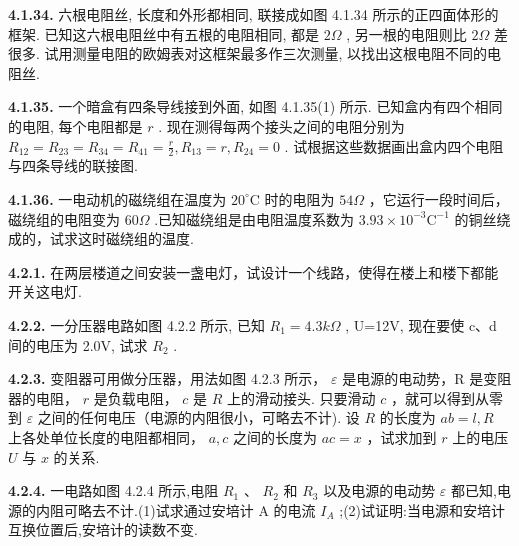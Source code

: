 \begin{center}
\end{center}

\vfill
\newpage

\textbf{4.1.34.} 六根电阻丝, 长度和外形都相同, 联接成如图 4.1.34 所示的正四面体形的框架. 已知这六根电阻丝中有五根的电阻相同, 都是 $2\Omega$ , 另一根的电阻则比 $2\Omega$ 差很多. 试用测量电阻的欧姆表对这框架最多作三次测量, 以找出这根电阻不同的电阻丝.

\vfill
\newpage

\textbf{4.1.35.} 一个暗盒有四条导线接到外面, 如图 4.1.35(1) 所示. 已知盒内有四个相同的电阻, 每个电阻都是 $r$ . 现在测得每两个接头之间的电阻分别为 $\displaystyle R_{12} = R_{23} = R_{34} = R_{41} = \frac{r}{2}, R_{13} = r, R_{24} = 0$ . 试根据这些数据画出盒内四个电阻与四条导线的联接图.

\begin{center}
\end{center}

\vfill
\newpage

\textbf{4.1.36.} 一电动机的磁绕组在温度为 $20^{\circ}\mathrm{C}$ 时的电阻为 $54\Omega$ ，它运行一段时间后，磁绕组的电阻变为 $60\Omega$ .已知磁绕组是由电阻温度系数为 $3.93\times 10^{-3}\mathrm{C}^{-1}$ 的铜丝绕成的，试求这时磁绕组的温度.

\vfill
\newpage

\textbf{4.2.1.} 在两层楼道之间安装一盏电灯，试设计一个线路，使得在楼上和楼下都能开关这电灯.

\vfill
\newpage

\textbf{4.2.2.} 一分压器电路如图 4.2.2 所示, 已知 $R_{1}=4.3k\Omega$ , U=12V, 现在要使 c、d 间的电压为 2.0V, 试求 $R_{2}$ .

\vfill
\newpage

\textbf{4.2.3.} 变阻器可用做分压器，用法如图 4.2.3 所示， $\varepsilon$ 是电源的电动势，R 是变阻器的电阻， $r$ 是负载电阻， $c$ 是 $R$ 上的滑动接头. 只要滑动 $c$ ，就可以得到从零到 $\varepsilon$ 之间的任何电压（电源的内阻很小，可略去不计). 设 $R$ 的长度为 $ab = l, R$ 上各处单位长度的电阻都相同， $a, c$ 之间的长度为 $ac = x$ ，试求加到 $r$ 上的电压 $U$ 与 $x$ 的关系.

\vfill
\newpage

\textbf{4.2.4.} 一电路如图 4.2.4 所示,电阻 $R_{1}$ 、 $R_{2}$ 和 $R_{3}$ 以及电源的电动势 $\varepsilon$ 都已知,电源的内阻可略去不计.(1)试求通过安培计 A 的电流 $I_{A}$ ;(2)试证明:当电源和安培计互换位置后,安培计的读数不变.

